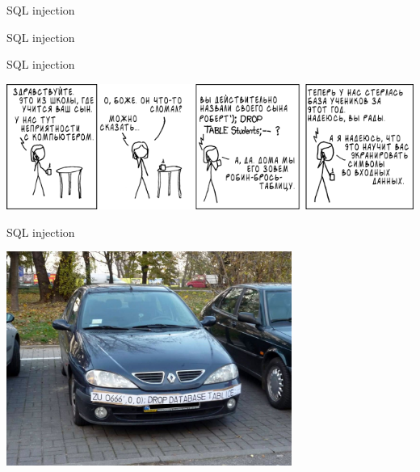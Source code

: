 \begin{frame}[fragile]{SQL injection}
  \begin{center}
    
  \end{center}
\end{frame}

\begin{frame}[fragile]{SQL injection}
  \begin{center}
    
  \end{center}
\end{frame}

\begin{frame}[fragile]{SQL injection}
  \begin{center}
    \includegraphics[width=\textwidth, keepaspectratio]{sources/images/sqlinject.png}
  \end{center}
\end{frame}

\begin{frame}[fragile]{SQL injection}
  \begin{center}
    \includegraphics[height=7cm, keepaspectratio]{sources/images/camera-sql-injection_2.jpg}
  \end{center}
\end{frame}
